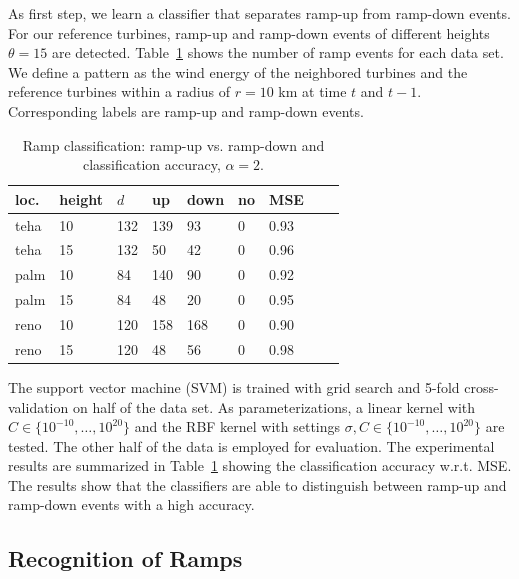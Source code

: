 \documentclass[10pt, conference, compsocconf]{IEEEtran}
\begin{document}
As first step, we learn a classifier that separates ramp-up from ramp-down events. For our reference turbines, ramp-up and ramp-down events of different heights $\theta = 15$ are detected. Table~\ref{tab:1} shows the number of ramp events for each data set. We define a pattern as the wind energy of the neighbored turbines and the reference turbines within a radius of $r=10$ km at time $t$ and $t-1$. Corresponding labels are ramp-up and ramp-down events.


\begin{table}
\small
\vspace{-0.5cm}
\caption{\label{tab:1}Ramp classification: ramp-up vs. ramp-down and classification accuracy, $\alpha = 2$.}
\begin{center}%
	\begin{tabular}{| l | l | l | l |l | l | l |l |l |}
\hline
loc.	&  height & $d$ & up & down & no  & MSE \\
\hline
teha & 10  & 132& 139 & 93 & 0 & 0.93\\ %
teha & 15 & 132&  50 & 42 & 0 & 0.96\\ %
\hline
palm & 10  & 84&  140 & 90 & 0 & 0.92\\ %
palm & 15 & 84& 48 & 20 & 0 & 0.95\\ %
\hline
reno & 10  & 120& 158 & 168 & 0 & 0.90\\ %
reno & 15 &  120 & 48 & 56 & 0 & 0.98\\  %
\hline
\end{tabular}
\end{center}
\end{table}


The support vector machine (SVM) is trained with grid search and 5-fold cross-validation on half of the data set. As parameterizations, a linear kernel with $C \in \{ 10^{-10}, \ldots, 10^{20} \}$ and the RBF kernel with settings $\sigma, C \in \{10^{-10}, \ldots, 10^{20} \}$ are tested. The other half of the data is employed for evaluation. The experimental results are summarized in Table~\ref{tab:1} showing the classification accuracy w.r.t. MSE. The results show that the classifiers are able to distinguish between ramp-up and ramp-down events with a high accuracy.


\subsection{Recognition of Ramps}
\end{document}
